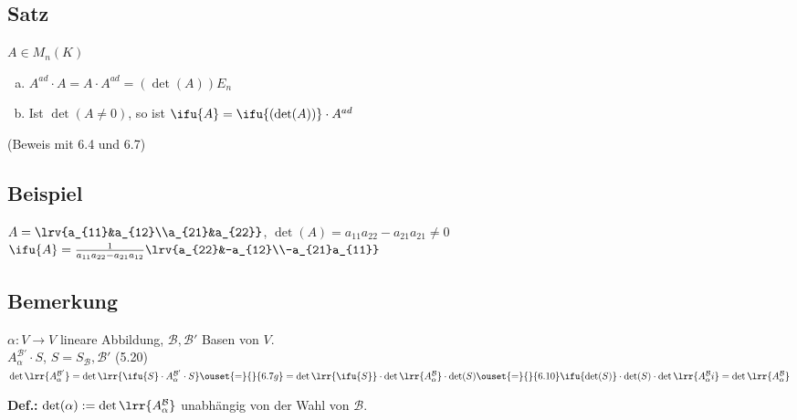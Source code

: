 \subsection{Satz}
$A\in M_n(K)$
\begin{enumerate}[a)]
  \item $A^{ad}\cdot A=A\cdot A^{ad}=(\det(A))E_n$
  \item Ist $\det(A\neq 0)$, so ist $\ifu{A}=\ifu{(\det(A))}\cdot A^{ad}$
\end{enumerate}
(Beweis mit 6.4 und 6.7)

\subsection{Beispiel}
$A=\lrv{a_{11}&a_{12}\\a_{21}&a_{22}}$, $\det(A)=a_{11}a_{22}-a_{21}a_{21}\neq 0$\\
$\ifu{A}=\frac{1}{a_{11}a_{22}-a_{21}a_{12}}\lrv{a_{22}&-a_{12}\\-a_{21}a_{11}}$

\subsection{Bemerkung}
$\alpha:V\rightarrow V$ lineare Abbildung, $\mathcal{B},\mathcal{B}'$ Basen von $V$.\\
$A_\alpha^{\mathcal{B}'}\cdot S$, $S=S_{\mathcal{B}},\mathcal{B}'$ (5.20)\\
$\det\lrr{A_\alpha^{\mathcal{B}'}}=\det\lrr{\ifu{S}\cdot A_\alpha^{\mathcal{B}'}\cdot
S}\ouset{=}{}{6.7g}=\det\lrr{\ifu{S}}\cdot\det\lrr{A_\alpha^{\mathcal{B}}}\cdot\det(S)\ouset{=}{}{6.10}\ifu{\det(S)}\cdot\det(S)\cdot\det\lrr{A_\alpha^{\mathcal{B}}i}=\det\lrr{A_\alpha^{\mathcal{B}}}$

\textbf{Def.:} $\det(\alpha):=\det\lrr{A_\alpha^{\mathcal{B}}}$ unabhängig von
der Wahl von $\mathcal{B}$.
